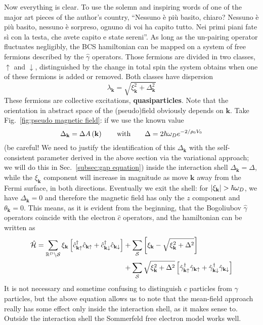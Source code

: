 Now everything is clear. To use the solemn and inspiring words of one of the major art pieces of the author's country, ``Nessuno è più basito, chiaro? Nessuno è più basito, nessuno è sorpreso, ognuno di voi ha capito tutto. Nei primi piani fate sì con la testa, che avete capito e state sereni''. As long as the un-pairing operator fluctuates negligibly, the BCS hamiltonian can be mapped on a system of free fermions described by the $\hat{\gamma}$ operators. Those fermions are divided in two classes, $\uparrow$ and $\downarrow$, distinguished by the change in total spin the system obtains when one of these fermions is added or removed. Both classes have dispersion
\[
	\lambda_\mathbf{k} = \sqrt{\xi_\mathbf{k}^2 + \Delta_\mathbf{k}^2}
\]
These fermions are collective excitations, \textbf{quasiparticles}. Note that the orientation in abstract space of the (pseudo)field obviously depends on $\mathbf{k}$. Take Fig.~\ref{fig:pseudo magnetic field}: if we use the known value
\[
	\Delta_\mathbf{k} = \Delta A\lrR{\mathbf{k}}
	\quad\qq{with}\quad
	\Delta = 2 \hbar\omega_D e^{-2/\rho_0 V_0}
\]
(be careful! We need to justify the identification of this $\Delta_\mathbf{k}$ with the self-consistent parameter derived in the above section via the variational approach; we will do this in Sec.~\ref{subsec:gap equation}) inside the interaction shell $\Delta_\mathbf{k} = \Delta$, while the $\xi_\mathbf{k}$ component will increase in magnitude as move $\mathbf{k}$ away from the Fermi surface, in both directions. Eventually we exit the shell: for $\abs{\xi_\mathbf{k}} > \hbar\omega_D$, we have $\Delta_\mathbf{k} = 0$ and therefore the magnetic field has only the $z$ component and $\theta_\mathbf{k}=0$.  This means, as it is evident from the beginning, that the Bogoliubov $\hat{\gamma}$ operators coincide with the electron $\hat{c}$ operators, and the hamiltonian can be written as
\[
\begin{aligned}
	\hat{\mathcal{H}} = \sum_{\mathbb{R}^D\setminus\mathcal{S}} \xi_\mathbf{k} \left[{ \hat{c}_{\mathbf{k}\uparrow}^\dagger \hat{c}_{\mathbf{k}\uparrow}
	+ \hat{c}_{\mathbf{k}\downarrow}^\dagger \hat{c}_{\mathbf{k}\downarrow}}\right] &+ \sum_\mathcal{S} \left[{\xi_\mathbf{k} - \sqrt{\xi_\mathbf{k}^2 + \Delta^2}}\right] \\ 		
	&+ \sum_\mathcal{S} \sqrt{\xi_\mathbf{k}^2 + \Delta^2} \left[{ \hat{\gamma}_{\mathbf{k}\uparrow}^\dagger \hat{\gamma}_{\mathbf{k}\uparrow} + \hat{\gamma}_{\mathbf{k}\downarrow}^\dagger \hat{\gamma}_{\mathbf{k}\downarrow}}\right]
\end{aligned}
\]
It is not necessary and sometime confusing to distinguish $c$ particles from $\gamma$ particles, but the above equation allows us to note that the mean-field approach really has some effect only inside the interaction shell, as it makes sense to. Outside the interaction shell the Sommerfeld free electron model works well.


